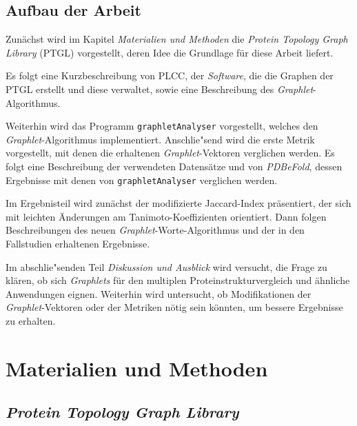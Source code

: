 \documentclass{report}
\begin{document}
\section{Aufbau der Arbeit}

Zun\"achst wird im Kapitel \emph{Materialien und Methoden} die \textit{Protein Topology Graph Library} (PTGL) \cite{ptgl1} vorgestellt, deren Idee die Grundlage f\"ur diese Arbeit liefert. 
 
Es folgt eine Kurzbeschreibung von PLCC, der \textit{Software}, die die Graphen der PTGL erstellt und diese verwaltet, sowie eine Beschreibung des \textit{Graphlet}-Algorithmus.

Weiterhin wird das Programm \texttt{graphletAnalyser} vorgestellt, welches den \textit{Graphlet}-Algorithmus implementiert.
Anschlie"send wird die erste Metrik vorgestellt, mit denen die erhaltenen \textit{Graphlet}-Vektoren verglichen werden. Es folgt eine Beschreibung der verwendeten Datens\"atze und von \textit{PDBeFold}, dessen Ergebnisse mit denen von \texttt{graphletAnalyser} verglichen werden.

Im Ergebnisteil wird zun\"achst der modifizierte Jaccard-Index pr\"asentiert, der sich mit leichten \"Anderungen am Tanimoto-Koeffizienten orientiert. Dann folgen Beschreibungen des neuen \textit{Graphlet}-Worte-Algorithmus und der in den Fallstudien erhaltenen Ergebnisse.

Im abschlie"senden Teil \emph{Diskussion und Ausblick} wird versucht, die Frage zu kl\"aren, ob sich \textit{Graphlets} f\"ur den multiplen Proteinstrukturvergleich und \"ahnliche Anwendungen eignen. Weiterhin wird untersucht, ob Modifikationen der \textit{Graphlet}-Vektoren oder der Metriken n\"otig sein k\"onnten, um bessere Ergebnisse zu erhalten. 



\chapter{Materialien und Methoden}






\section{\textit{Protein Topology Graph Library}}
\end{document}
